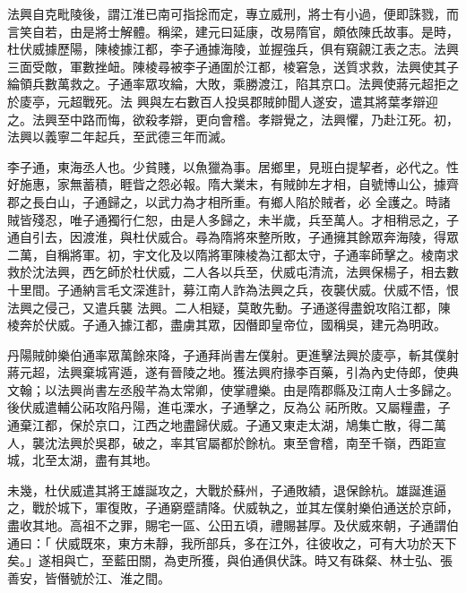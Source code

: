\begin{pinyinscope}
 法興自克毗陵後，謂江淮已南可指捴而定，專立威刑，將士有小過，便即誅戮，而言笑自若，由是將士解體。稱梁，建元曰延康，改易隋官，頗依陳氏故事。是時，杜伏威據歷陽，陳棱據江都，李子通據海陵，並握強兵，俱有窺覦江表之志。法興三面受敵，軍數挫衄。陳棱尋被李子通圍於江都，棱窘急，送質求救，法興使其子綸領兵數萬救之。子通率眾攻綸，大敗，乘勝渡江，陷其京口。法興使蔣元超拒之於庱亭，元超戰死。法
 興與左右數百人投吳郡賊帥聞人遂安，遣其將葉孝辯迎之。法興至中路而悔，欲殺孝辯，更向會稽。孝辯覺之，法興懼，乃赴江死。初，法興以義寧二年起兵，至武德三年而滅。



 李子通，東海丞人也。少貧賤，以魚獵為事。居鄉里，見班白提挈者，必代之。性好施惠，家無蓄積，睚眥之怨必報。隋大業末，有賊帥左才相，自號博山公，據齊郡之長白山，子通歸之，以武力為才相所重。有鄉人陷於賊者，必
 全護之。時諸賊皆殘忍，唯子通獨行仁恕，由是人多歸之，未半歲，兵至萬人。才相稍忌之，子通自引去，因渡淮，與杜伏威合。尋為隋將來整所敗，子通擁其餘眾奔海陵，得眾二萬，自稱將軍。初，宇文化及以隋將軍陳棱為江都太守，子通率師擊之。棱南求救於沈法興，西乞師於杜伏威，二人各以兵至，伏威屯清流，法興保楊子，相去數十里間。子通納言毛文深進計，募江南人詐為法興之兵，夜襲伏威。伏威不悟，恨法興之侵己，又遣兵襲
 法興。二人相疑，莫敢先動。子通遂得盡銳攻陷江都，陳棱奔於伏威。子通入據江都，盡虜其眾，因僭即皇帝位，國稱吳，建元為明政。



 丹陽賊帥樂伯通率眾萬餘來降，子通拜尚書左僕射。更進擊法興於庱亭，斬其僕射蔣元超，法興棄城宵遁，遂有晉陵之地。獲法興府掾李百藥，引為內史侍郎，使典文翰；以法興尚書左丞殷芊為太常卿，使掌禮樂。由是隋郡縣及江南人士多歸之。後伏威遣輔公祏攻陷丹陽，進屯溧水，子通擊之，反為公
 祏所敗。又屬糧盡，子通棄江都，保於京口，江西之地盡歸伏威。子通又東走太湖，鳩集亡散，得二萬人，襲沈法興於吳郡，破之，率其官屬都於餘杭。東至會稽，南至千嶺，西距宣城，北至太湖，盡有其地。



 未幾，杜伏威遣其將王雄誕攻之，大戰於蘇州，子通敗績，退保餘杭。雄誕進逼之，戰於城下，軍復敗，子通窮蹙請降。伏威執之，並其左僕射樂伯通送於京師，盡收其地。高祖不之罪，賜宅一區、公田五頃，禮賜甚厚。及伏威來朝，子通謂伯通曰：「
 伏威既來，東方未靜，我所部兵，多在江外，往彼收之，可有大功於天下矣。」遂相與亡，至藍田關，為吏所獲，與伯通俱伏誅。時又有硃粲、林士弘、張善安，皆僭號於江、淮之間。




\end{pinyinscope}
